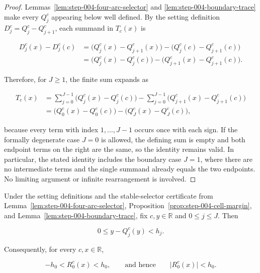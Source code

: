 \begin{proof}
Lemmas~\ref{lem:step-004-four-arc-selector} and
\ref{lem:step-004-boundary-trace} make every \(Q_j^c\) appearing below
well defined. By the setting definition \(D_j^c=Q_j^c-Q_{j+1}^c\), each
summand in \(T_c(x)\) is

\[
\begin{aligned}
D_j^c(x)-D_j^c(c)
&=\bigl(Q_j^c(x)-Q_{j+1}^c(x)\bigr)
  -\bigl(Q_j^c(c)-Q_{j+1}^c(c)\bigr)\\
&=\bigl(Q_j^c(x)-Q_j^c(c)\bigr)
  -\bigl(Q_{j+1}^c(x)-Q_{j+1}^c(c)\bigr).
\end{aligned}
\]

Therefore, for \(J\geq1\), the finite sum expands as

\[
\begin{aligned}
T_c(x)
&=\sum_{j=0}^{J-1}\bigl(Q_j^c(x)-Q_j^c(c)\bigr)
  -\sum_{j=0}^{J-1}\bigl(Q_{j+1}^c(x)-Q_{j+1}^c(c)\bigr)\\
&=\bigl(Q_0^c(x)-Q_0^c(c)\bigr)
  -\bigl(Q_J^c(x)-Q_J^c(c)\bigr),
\end{aligned}
\]

because every term with index \(1,\ldots,J-1\) occurs once with each sign. If the formally degenerate case \(J=0\) is allowed, the defining sum is empty and both endpoint terms on the right are the same, so the identity remains valid. In particular, the stated identity includes the boundary case \(J=1\), where there are no intermediate terms and the single summand already equals the two endpoints. No limiting argument or infinite rearrangement is involved.
\end{proof}

\begin{lemma}\label{lem:step-006-floor-remainder}
Under the setting definitions and the stable-selector certificate from Lemma~\ref{lem:step-004-four-arc-selector}, Proposition~\ref{prop:step-004-cell-margin}, and Lemma~\ref{lem:step-004-boundary-trace}, fix \(c,y\in\mathbb R\) and \(0\leq j\leq J\). Then

\[
0\leq y-Q_j^c(y)<h_j.
\]

Consequently, for every \(c,x\in\mathbb R\),

\[
-h_0<R_0^c(x)<h_0,
\qquad\text{and hence}\qquad
\lvert R_0^c(x)\rvert<h_0.
\]
\end{lemma}

